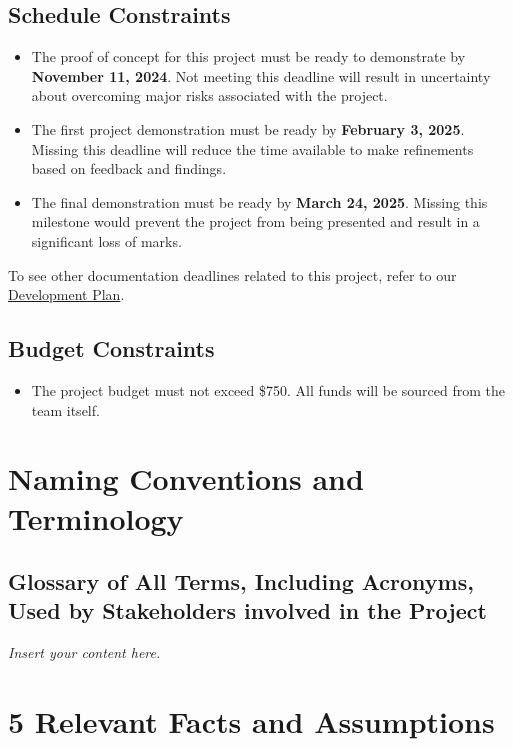 \documentclass[12pt]{article}
\newcommand{\lips}{\textit{Insert your content here.}}
\begin{document}
\subsection{Schedule Constraints}
\begin{itemize}
  \item The proof of concept for this project must be ready to demonstrate by \textbf{November 11, 2024}. Not meeting this deadline will result in uncertainty about overcoming major risks associated with the project.
  \item The first project demonstration must be ready by \textbf{February 3, 2025}. Missing this deadline will reduce the time available to make refinements based on feedback and findings.
  \item The final demonstration must be ready by \textbf{March 24, 2025}. Missing this milestone would prevent the project from being presented and result in a significant loss of marks.
\end{itemize}
To see other documentation deadlines related to this project, refer to our \href{https://github.com/OKKM-insights/OKKM.insights/blob/main/docs/DevelopmentPlan/DevelopmentPlan.pdf}{Development Plan}. 
\subsection{Budget Constraints}
\begin{itemize}
  \item The project budget must not exceed \$750. All funds will be sourced from the team itself.
\end{itemize}

\section{Naming Conventions and Terminology}
\subsection{Glossary of All Terms, Including Acronyms, Used by Stakeholders
involved in the Project}
\lips

\section*{5 Relevant Facts and Assumptions}
\end{document}
